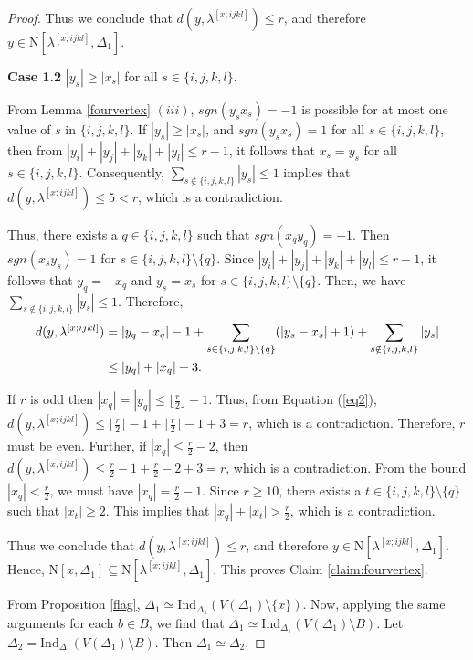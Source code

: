 \documentclass[10pt,a4paper]{amsart}
\def\n{{\mathrm{N}}}
\newcommand{\D}{\Delta}
\newcommand{\f}{\lfloor\frac{r}{2}\rfloor}
\begin{document}
\begin{proof}
	Thus we conclude that $d(y, \lambda^{[x;ijkl]}) \leq r$, and therefore $y \in \n[\lambda^{[x;ijkl]}, \D_1]$.
	

    \smallskip
	\noindent 
	\textbf{Case 1.2} $|y_s|\geq |x_s|$ for all $s\in\{i,j,k,l\}$. 
	
	
	From Lemma \ref{fourvertex} $(iii)$, $sgn(y_sx_s)=-1$ is possible for at most one value of $s$ in $\{i,j,k,l\}$. 
	If $|y_s|\geq |x_s|$, and $sgn(y_sx_s)=1$ for all $s\in \{i,j,k, l\}$, then from $|y_i|+|y_j|+|y_k|+|y_l|\leq r-1$, it follows that $x_s=y_s$ for all $s\in \{i,j,k,l\}$. Consequently, $\sum_{s\notin\{i,j,k,l\}}|y_s|\leq 1$ implies that $d(y,\lambda^{[x;ijkl]})\leq 5<r$, which is a contradiction.  
	
	Thus, there exists a $q\in\{i,j,k,l\}$ such that $sgn(x_qy_q)=-1$. Then $sgn(x_sy_s)=1$ for $s\in\{i,j,k,l\}\setminus\{q\}$. Since $|y_i|+|y_j|+|y_k|+|y_l|\leq r-1$, it follows that $y_q=-x_q$ and $y_s=x_s$ for $s\in\{i,j,k,l\}\setminus\{q\}$. Then, we have $\sum_{s\notin\{i,j,k,l\}}|y_s|\leq 1$. Therefore, 
	\begin{align}
		d(y,\lambda^{[x;ijkl]})&=|y_q-x_q|-1+\sum_{s\in\{i,j,k,l\}\setminus\{q\}}(|y_s-x_s|+1)+\sum_{s\notin\{i,j,k,l\}}|y_s| \notag
		\\
		&\leq |y_q|+|x_q|+3. \label{eq2}
	\end{align}
	
	If $r$ is odd then $|x_q|=|y_q|\leq \f-1$. Thus, from Equation (\ref{eq2}),
	$d(y,\lambda^{[x;ijkl]})\leq \f-1+\f-1+3=r$, which is a contradiction.  Therefore, $r$ must be even. 
	Further, if $|x_q|\leq \frac{r}{2}-2$, then  $d(y,\lambda^{[x;ijkl]})\leq \frac{r}{2}-1+\frac{r}{2}-2+3=r$, which is a contradiction. From the bound  $|x_q|<\frac{r}{2}$, we must have $|x_q|=\frac{r}{2}-1$. Since $r\geq 10$, there exists a $t\in \{i, j, k, l\}\setminus \{q\}$ such that $|x_t|\geq 2$. This implies that $|x_q|+|x_t|>\frac{r}{2}$, which is a contradiction.
	
	Thus we conclude that $d(y, \lambda^{[x;ijkl]}) \leq r$, and therefore $y \in \n[\lambda^{[x;ijkl]}, \D_1]$.  Hence, $\n[x,\D_1]\subseteq \n[\lambda^{[x;ijkl]},\D_1]$. This proves Claim \ref{claim:fourvertex}.  
	
	
	From Proposition \ref{flag}, $\D_1\simeq \mathrm{Ind}_{\D_1}(V(\D_1)\setminus \{x\})$. Now, applying the same arguments for each $b\in B$, we find that $\D_1\simeq \mathrm{Ind}_{\D_1}(V(\D_1)\setminus B)$. 
	Let $\D_2=\mathrm{Ind}_{\D_1}(V(\D_1)\setminus B)$. Then $\D_1\simeq \D_2$.
	
	
	

\end{proof}
\end{document}
